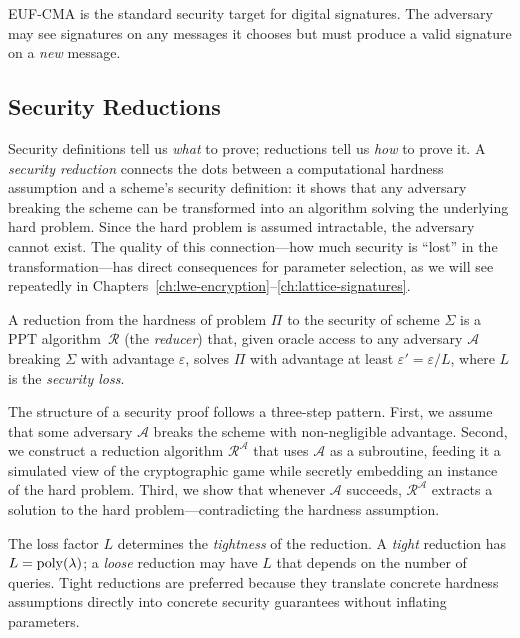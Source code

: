 EUF-CMA is the standard security target for digital signatures.  The adversary may see signatures on any messages it chooses but must produce a valid signature on a \emph{new} message.


\subsection{Security Reductions}
\label{subsec:security-reductions}

Security definitions tell us \emph{what} to prove; reductions tell us \emph{how} to prove it.  A \emph{security reduction} connects the dots between a computational hardness assumption and a scheme's security definition: it shows that any adversary breaking the scheme can be transformed into an algorithm solving the underlying hard problem.  Since the hard problem is assumed intractable, the adversary cannot exist.  The quality of this connection---how much security is ``lost'' in the transformation---has direct consequences for parameter selection, as we will see repeatedly in Chapters~\ref{ch:lwe-encryption}--\ref{ch:lattice-signatures}.

\begin{definition}
\label{def:reduction-structure}
A reduction from the hardness of problem $\Pi$ to the security of scheme $\Sigma$ is a PPT algorithm~$\mathcal{R}$ (the \emph{reducer}) that, given oracle access to any adversary $\mathcal{A}$ breaking $\Sigma$ with advantage $\varepsilon$, solves $\Pi$ with advantage at least $\varepsilon' = \varepsilon / L$, where $L$ is the \emph{security loss}.
\end{definition}

The structure of a security proof follows a three-step pattern.  First, we assume that some adversary $\mathcal{A}$ breaks the scheme with non-negligible advantage.  Second, we construct a reduction algorithm $\mathcal{R}^\mathcal{A}$ that uses $\mathcal{A}$ as a subroutine, feeding it a simulated view of the cryptographic game while secretly embedding an instance of the hard problem.  Third, we show that whenever $\mathcal{A}$ succeeds, $\mathcal{R}^\mathcal{A}$ extracts a solution to the hard problem---contradicting the hardness assumption.

The loss factor $L$ determines the \emph{tightness} of the reduction.  A \emph{tight} reduction has $L = \operatorname{poly}(\lambda)$; a \emph{loose} reduction may have $L$ that depends on the number of queries.  Tight reductions are preferred because they translate concrete hardness assumptions directly into concrete security guarantees without inflating parameters.

